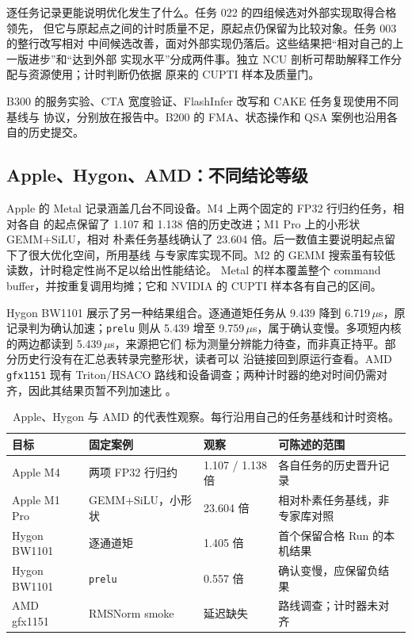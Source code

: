 \documentclass[UTF8,11pt,a4paper,fontset=none]{ctexart}
\newcommand{\code}[1]{\texttt{#1}}
\begin{document}
逐任务记录更能说明优化发生了什么。任务 022 的四组候选对外部实现取得合格领先，
但它与原起点之间的计时质量不足，原起点仍保留为比较对象。任务 003 的整行改写相对
中间候选改善，面对外部实现仍落后。这些结果把“相对自己的上一版进步”和“达到外部
实现水平”分成两件事。独立 NCU 剖析可帮助解释工作分配与资源使用；计时判断仍依据
原来的 CUPTI 样本及质量门\cite{nvidia}。

B300 的服务实验、CTA 宽度验证、FlashInfer 改写和 CAKE 任务复现使用不同基线与
协议，分别放在报告中。B200 的 FMA、状态操作和 QSA 案例也沿用各自的历史提交。

\subsection{Apple、Hygon、AMD：不同结论等级}
Apple 的 Metal 记录涵盖几台不同设备。M4 上两个固定的 FP32 行归约任务，相对各自
的起点保留了 1.107 和 1.138 倍的历史改进；M1 Pro 上的小形状 GEMM+SiLU，相对
朴素任务基线确认了 23.604 倍。后一数值主要说明起点留下了很大优化空间，所用基线
与专家库实现不同。M2 的 GEMM 搜索虽有较低读数，计时稳定性尚不足以给出性能结论。
Metal 的样本覆盖整个 command buffer，并按重复调用均摊；它和 NVIDIA 的 CUPTI
样本各有自己的区间\cite{metalresults}。

Hygon BW1101 展示了另一种结果组合。逐通道矩任务从 9.439 降到
6.719\,$\mu$s，原记录判为确认加速；\code{prelu} 则从 5.439 增至
9.759\,$\mu$s，属于确认变慢。多项短内核的两边都读到 5.439\,$\mu$s，来源把它们
标为测量分辨能力待查，而非真正持平。部分历史行没有在汇总表转录完整形状，读者可以
沿链接回到原运行查看\cite{dcuresults}。AMD \code{gfx1151} 现有 Triton/HSACO
路线和设备调查；两种计时器的绝对时间仍需对齐，因此其结果页暂不列加速比
\cite{amdresults}。

\begin{table}[htbp]
\centering\small
\caption{Apple、Hygon 与 AMD 的代表性观察。每行沿用自己的任务基线和计时资格。}
\label{tab:platform-cases}
\begin{tabularx}{\textwidth}{@{}p{24mm}p{31mm}p{27mm}Y@{}}
\toprule
{}目标 & 固定案例 & 观察 & 可陈述的范围 \\
\midrule
Apple M4 & 两项 FP32 行归约 & 1.107 / 1.138 倍 & 各自任务的历史晋升记录 \\
Apple M1 Pro & GEMM+SiLU，小形状 & 23.604 倍 & 相对朴素任务基线，非专家库对照 \\
Hygon BW1101 & 逐通道矩 & 1.405 倍 & 首个保留合格 Run 的本机结果 \\
Hygon BW1101 & \code{prelu} & 0.557 倍 & 确认变慢，应保留负结果 \\
AMD gfx1151 & RMSNorm smoke & 延迟缺失 & 路线调查；计时器未对齐 \\
\bottomrule
\end{tabularx}
\end{table}
\end{document}

